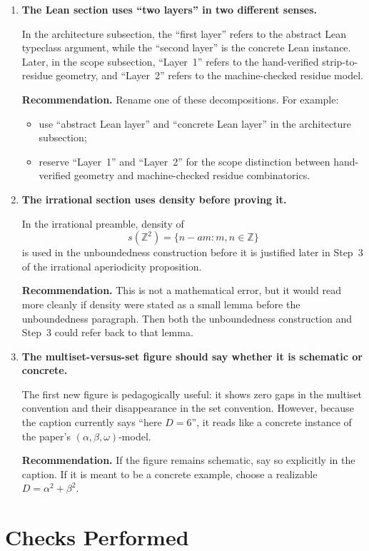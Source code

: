 \documentclass[11pt]{article}
\begin{document}
\begin{enumerate}[label=\textbf{F\arabic*.},leftmargin=*]
\item \textbf{The Lean section uses ``two layers'' in two different senses.}

In the architecture subsection, the ``first layer'' refers to the abstract
Lean typeclass argument, while the ``second layer'' is the concrete Lean
instance.  Later, in the scope subsection, ``Layer~1'' refers to the
hand-verified strip-to-residue geometry, and ``Layer~2'' refers to the
machine-checked residue model.

\textbf{Recommendation.}  Rename one of these decompositions.  For example:
\begin{itemize}[leftmargin=*]
  \item use ``abstract Lean layer'' and ``concrete Lean layer'' in the
  architecture subsection;
  \item reserve ``Layer~1'' and ``Layer~2'' for the scope distinction between
  hand-verified geometry and machine-checked residue combinatorics.
\end{itemize}

\item \textbf{The irrational section uses density before proving it.}

In the irrational preamble, density of
\[
s(\mathbb Z^2)=\{n-am:m,n\in\mathbb Z\}
\]
is used in the unboundedness construction before it is justified later in
Step~3 of the irrational aperiodicity proposition.

\textbf{Recommendation.}  This is not a mathematical error, but it would read
more cleanly if density were stated as a small lemma before the unboundedness
paragraph.  Then both the unboundedness construction and Step~3 could refer
back to that lemma.

\item \textbf{The multiset-versus-set figure should say whether it is
schematic or concrete.}

The first new figure is pedagogically useful: it shows zero gaps in the
multiset convention and their disappearance in the set convention.  However,
because the caption currently says ``here \(D=6\)'', it reads like a concrete
instance of the paper's \((\alpha,\beta,\omega)\)-model.

\textbf{Recommendation.}  If the figure remains schematic, say so explicitly
in the caption.  If it is meant to be a concrete example, choose a realizable
\(D=\alpha^2+\beta^2\).

\end{enumerate}

\section*{Checks Performed}
\end{document}
